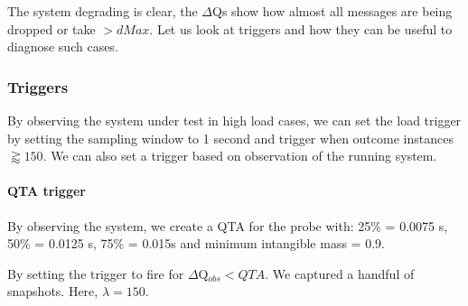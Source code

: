     The system degrading is clear, the $\Delta$Qs show how almost all messages are being dropped or take $> dMax$. Let us look at triggers and how they can be useful to diagnose such cases.
  
    \subsubsection{Triggers}
        By observing the system under test in high load cases, we can set the load trigger by setting the sampling window to 1 second and trigger when outcome instances $\gtrapprox 150$. We can also set a trigger based on observation of the running system.

        \paragraph{QTA trigger}
            By observing the system, we create a QTA for the probe with: 25\% = 0.0075 s, 50\% = 0.0125 s, 75\% = 0.015s and minimum intangible mass = 0.9.

            By setting the trigger to fire for $\Delta$Q$_{obs} < QTA$. We captured a handful of snapshots. Here, $\lambda = 150$.
        
